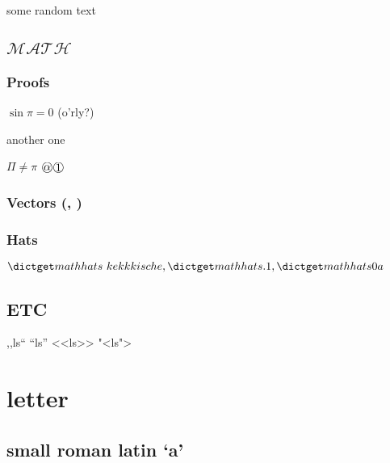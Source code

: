 \documentclass{trlnotes}
\begin{document}
some random text

\blinddocument

\section{$\mathcal{M\!AT\!H}$\underdev}

\subsection{Proofs}
\label{sub:proofs}


\begin{tproof}[kek?]
  $\sin\pi=0$ (o'rly?)
  \begin{lproof}[nested]
    another one
    \begin{pproof}
      $\Pi\neq\pi$
      {%
        \fboxsep=0pt
        \fbox{$\bigcirc$}\fbox{$\mathord{\Rightarrow}\vphantom{<}$}
      }%
      \circlearound{$\mathord{\Rightarrow}\vphantom{>}$}%
      $\circlearound{\alpha}\,\circlearound{1}$
    \end{pproof}
  \end{lproof}
\end{tproof}

\subsection{Vectors (\coori, \conori)}
\subsection{Hats}

\makeatletter
\makeatother
\begingroup
$\ov~{kekkkische}, \ov.{1}, \ov0a$
\endgroup
\section{ETC}
,,ls`` "`ls"' <<ls>> "<ls">

\appendix
\chapter{letter}
\section{small roman latin `a'}
\end{document}
